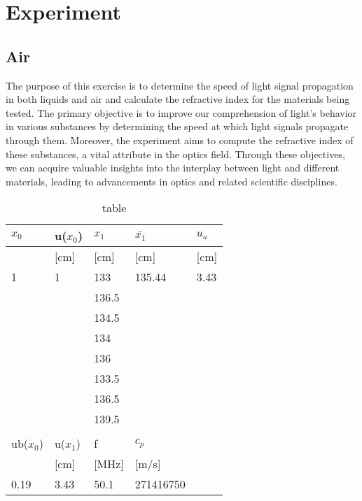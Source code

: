 \section{Experiment}

\subsection{Air}

The purpose of this exercise is to determine the speed of light signal propagation in both liquids and air and calculate the refractive index for the materials being tested. The primary objective is to improve our comprehension of light's behavior in various substances by determining the speed at which light signals propagate through them. Moreover, the experiment aims to compute the refractive index of these substances, a vital attribute in the optics field. Through these objectives, we can acquire valuable insights into the interplay between light and different materials, leading to advancements in optics and related scientific disciplines.


\begin{table}[H]
    \centering
    \begin{tabular}{l|l|l|l|l}
   
        $x_0$ & u($x_0$) & $x_1$ &  $\bar{x_1}$ & $u_a$ \\ \hline
        [cm\^3] & [cm] & [cm] & [cm] & [cm] \\ \hline
        1 & 1 & 133 & 135.44 & 3.43 \\ \hline
        ~ & ~ & 136.5 & ~ & ~ \\ \hline
        ~ & ~ & 134.5 & ~ & ~ \\ \hline
        ~ & ~ & 134 & ~ & ~ \\ \hline
        ~ & ~ & 136 & ~ & ~ \\ \hline
        ~ & ~ & 133.5 & ~ & ~ \\ \hline
        ~ & ~ & 136.5 & ~ & ~ \\ \hline
        ~ & ~ & 139.5 & ~ & ~ \\ \hline
         \multicolumn{5}{c}{}\\ \hline
        ub($x_0$) & u($x_1$) & f  & $c_p$ & ~ \\ \hline
        [cm] & [cm] & [MHz] & [m/s] & ~ \\ \hline
        0.19 & 3.43 & 50.1 & 271416750 & ~ \\ 
        
    \end{tabular}
    \caption{table}
\end{table}

